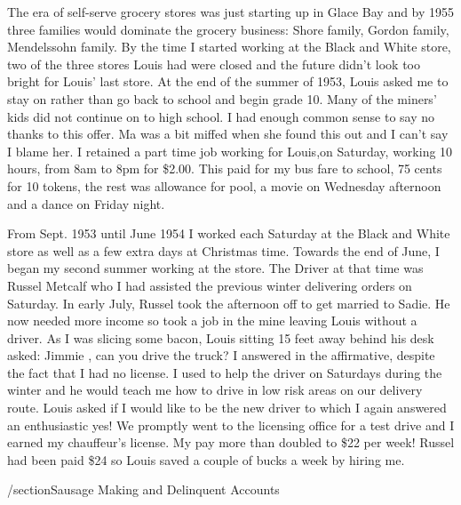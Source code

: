 The era of self-serve grocery stores was just starting up in Glace Bay and by 1955 three families would dominate the grocery business: Shore family, Gordon family, Mendelssohn family. By the time I started working at the Black and White store, two of the three stores Louis had were closed and the future didn't look too bright for Louis' last store. At the end of the summer of 1953, Louis asked me to stay on rather than go back to school and begin grade 10. Many of the miners' kids did not continue on to high school. I had enough common sense to say no thanks to this offer. Ma was a bit miffed when she found this out and I can't say I blame her. I retained a part time job working for Louis,on Saturday, working 10 hours, from 8am to 8pm for \$2.00. This paid for my bus fare to school, 75 cents for 10 tokens, the rest was allowance for pool, a movie on Wednesday afternoon and a dance on Friday night.

From Sept. 1953 until June 1954 I worked each Saturday at the Black and White store as well as a few extra days at Christmas time. Towards the end of June, I began my second summer working at the store. The Driver at that time was Russel Metcalf who I had assisted the previous winter delivering orders on Saturday. In early July, Russel took the afternoon off to get married to Sadie. He now needed more income so took a job in the mine leaving Louis without a driver. As I was slicing some bacon, Louis sitting 15 feet away behind his desk asked: Jimmie , can you drive the truck? I answered in the affirmative, despite the fact that I had no license. I used to help the driver on Saturdays during the winter and he would teach me how to drive in low risk areas on our delivery route. Louis asked if I would like to be the new driver to which I again answered an enthusiastic yes! We promptly went to the licensing office for a test drive and I earned my chauffeur's license. My pay more than doubled to \$22 per week! Russel had been paid \$24 so Louis saved a couple of bucks a week by hiring me. 

/section{Sausage Making and Delinquent Accounts}

